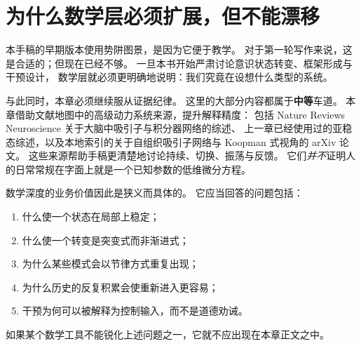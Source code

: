 \section{为什么数学层必须扩展，但不能漂移}

本手稿的早期版本使用势阱图景，是因为它便于教学。
对于第一轮写作来说，这是合适的；但现在已经不够。
一旦本书开始严肃讨论意识状态转变、框架形成与干预设计，
数学层就必须更明确地说明：我们究竟在设想什么类型的系统。

与此同时，本章必须继续服从证据纪律。
这里的大部分内容都属于\textbf{中等}车道。
本章借助文献地图中的高级动力系统来源，提升解释精度：
包括 Nature Reviews Neuroscience 关于大脑中吸引子与积分器网络的综述、
上一章已经使用过的亚稳态综述，以及本地索引的关于自组织吸引子网络与 Koopman 式视角的 arXiv 论文。
这些来源帮助手稿更清楚地讨论持续、切换、振荡与反馈。
它们\emph{并不}证明人的日常常规在字面上就是一个已知参数的低维微分方程。

\begin{discussion}
数学深度的业务价值因此是狭义而具体的。
它应当回答的问题包括：
\begin{enumerate}[nosep]
  \item 什么使一个状态在局部上稳定；
  \item 什么使一个转变是突变式而非渐进式；
  \item 为什么某些模式会以节律方式重复出现；
  \item 为什么历史的反复积累会使重新进入更容易；
  \item 干预为何可以被解释为控制输入，而不是道德劝诫。
\end{enumerate}
如果某个数学工具不能锐化上述问题之一，它就不应出现在本章正文之中。
\end{discussion}